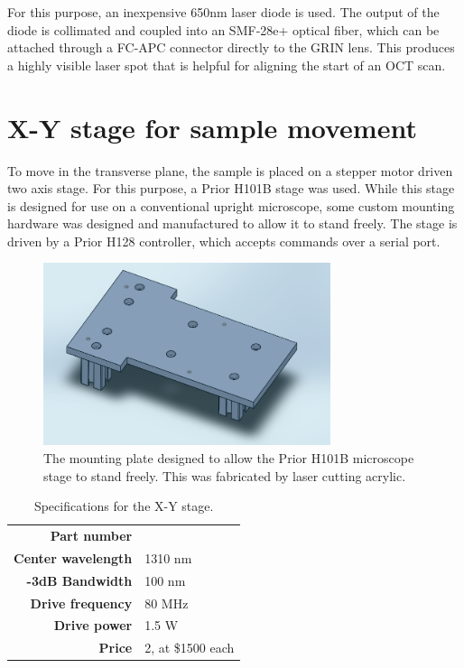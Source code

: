 For this purpose, an inexpensive 650nm laser diode is used. The output of the diode is collimated and coupled into an SMF-28e+ optical fiber, which can be attached through a FC-APC connector directly to the GRIN lens. This produces a highly visible laser spot that is helpful for aligning the start of an OCT scan.


\section{X-Y stage for sample movement}

To move in the transverse plane, the sample is placed on a stepper motor driven two axis stage. For this purpose, a Prior H101B stage was used. While this stage is designed for use on a conventional upright microscope, some custom mounting hardware was designed and manufactured to allow it to stand freely. The stage is driven by a Prior H128 controller, which accepts commands over a serial port.

\begin{figure}[h!]
\centering
\includegraphics[width=0.75\textwidth]{Images/Alignment/x-y-mount.png}
\caption{The mounting plate designed to allow the Prior H101B microscope stage to stand freely. This was fabricated by laser cutting acrylic.}
\end{figure}

\begin{table}[h!]
\centering
\begin{tabular}{ >{\bf}r | l}
Part number & \\
Center wavelength & 1310 nm \\
-3dB Bandwidth & 100 nm \\
Drive frequency & 80 MHz \\
Drive power & 1.5 W \\
Price & 2, at \$1500 each \\
\end{tabular}
\caption{Specifications for the X-Y stage.}
\end{table} 


